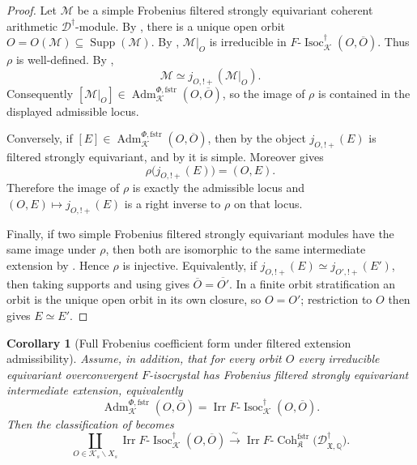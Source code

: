 \documentclass[11pt]{amsart}
\theoremstyle{plain}
\newtheorem{corollary}{Corollary}[section]
\theoremstyle{definition}
\theoremstyle{remark}
\newcommand{\Coh}{\operatorname{Coh}}
\newcommand{\Irr}{\operatorname{Irr}}
\newcommand{\Isoc}{\operatorname{Isoc}}
\newcommand{\Supp}{\operatorname{Supp}}
\newcommand{\fstr}{\mathrm{fstr}}
\newcommand{\Adm}{\operatorname{Adm}}
\begin{document}
\begin{proof}
Let \(\mathcal M\) be a simple Frobenius filtered strongly equivariant coherent
arithmetic \(\mathscr D^\dagger\)-module. By , there is
a unique open orbit \(O=O(\mathcal M)\subseteq\Supp(\mathcal M)\). By
, \(\mathcal M|_O\) is irreducible in
\(F\text{-}\Isoc^{\dagger}_{\mathcal K}(O,\overline O)\). Thus \(\rho\) is well-defined.
By ,
\[
  \mathcal M\simeq j_{O,!+}(\mathcal M|_O).
\]
Consequently \([\mathcal M|_O]\in
\Adm^{\Phi,\fstr}_{\mathcal K}(O,\overline O)\), so the image of \(\rho\) is contained
in the displayed admissible locus.

Conversely, if \([E]\in\Adm^{\Phi,\fstr}_{\mathcal K}(O,\overline O)\), then by
 the object \(j_{O,!+}(E)\) is
filtered strongly equivariant, and by 
it is simple.  Moreover  gives
\[
  \rho\bigl(j_{O,!+}(E)\bigr)=(O,E).
\]
Therefore the image of \(\rho\) is exactly the admissible locus and
\((O,E)\mapsto j_{O,!+}(E)\) is a right inverse to \(\rho\) on that locus.

Finally, if two simple Frobenius filtered strongly equivariant modules have the same
image under \(\rho\), then both are isomorphic to the same intermediate
extension by .  Hence \(\rho\) is injective.  Equivalently,
if \(j_{O,!+}(E)\simeq j_{O',!+}(E')\), then taking supports and using
 gives \(\overline O=\overline{O'}\).  In a
finite orbit stratification an orbit is the unique open orbit in its own
closure, so \(O=O'\); restriction to \(O\) then gives \(E\simeq E'\).
\end{proof}


\begin{corollary}[Full Frobenius coefficient form under filtered extension admissibility]
\label{cor:classification-full-isocrystals-under-FEH}
Assume, in addition, that for every orbit \(O\) every irreducible equivariant overconvergent \(F\)-isocrystal has Frobenius
filtered strongly equivariant intermediate extension, equivalently
\[
  \Adm^{\Phi,\fstr}_{\mathcal K}(O,\overline O)
  =
  \Irr F\text{-}\Isoc^{\dagger}_{\mathcal K}(O,\overline O).
\]
Then the classification of  becomes
\[
  \coprod_{O\in \mathcal K_s\backslash X_s}
  \Irr F\text{-}\Isoc^{\dagger}_{\mathcal K}(O,\overline O)
  \xrightarrow{\;\sim\;}
  \Irr F\text{-}\Coh^{\fstr}_{\mathfrak K}
  \bigl(\mathscr D^\dagger_{\mathfrak X,\mathbb Q}\bigr).
\]
\end{corollary}
\end{document}
